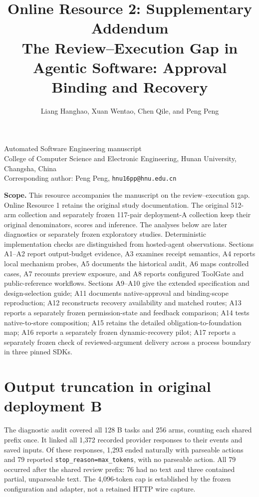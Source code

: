 \documentclass[10pt,a4paper]{article}
\title{Online Resource 2: Supplementary Addendum\protect\\
\large The Review--Execution Gap in Agentic Software: Approval Binding and Recovery}
\author{Liang Hanghao, Xuan Wentao, Chen Qile, and Peng Peng}
\date{}
\begin{document}
\maketitle
\begin{center}\small
Automated Software Engineering manuscript\\
College of Computer Science and Electronic Engineering, Hunan University, Changsha, China\\
Corresponding author: Peng Peng, \texttt{hnu16pp@hnu.edu.cn}
\end{center}
\noindent\textbf{Scope.} This resource accompanies the manuscript on the review--execution gap. Online Resource 1 retains the original study documentation. The original 512-arm collection and separately frozen 117-pair deployment-A collection keep their original denominators, scores and inference. The analyses below are later diagnostics or separately frozen exploratory studies. Deterministic implementation checks are distinguished from hosted-agent observations. Sections A1--A2 report output-budget evidence, A3 examines receipt semantics, A4 reports local mechanism probes, A5 documents the historical audit, A6 maps controlled cases, A7 recounts preview exposure, and A8 reports configured ToolGate and public-reference workflows. Sections A9--A10 give the extended specification and design-selection guide; A11 documents native-approval and binding-scope reproduction; A12 reconstructs recovery availability and matched routes; A13 reports a separately frozen permission-state and feedback comparison; A14 tests native-to-store composition; A15 retains the detailed obligation-to-foundation map; A16 reports a separately frozen dynamic-recovery pilot; A17 reports a separately frozen check of reviewed-argument delivery across a process boundary in three pinned SDKs.

\section{Output truncation in original deployment B}
The diagnostic audit covered all 128 B tasks and 256 arms, counting each shared prefix once. It linked all 1,372 recorded provider responses to their events and saved inputs. Of these responses, 1,293 ended naturally with parseable actions and 79 reported \texttt{stop\_reason=max\_tokens}, with no parseable action. All 79 occurred after the shared review prefix: 76 had no text and three contained partial, unparseable text. The 4,096-token cap is established by the frozen configuration and adapter, not a retained HTTP wire capture.
\end{document}
